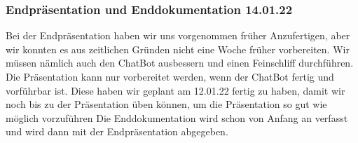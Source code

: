 \subsubsection{Endpräsentation und Enddokumentation 14.01.22}
Bei der Endpräsentation haben wir uns vorgenommen früher Anzufertigen, aber wir konnten es aus zeitlichen Gründen nicht eine Woche früher vorbereiten.
Wir müssen nämlich auch den ChatBot ausbessern und einen Feinschliff durchführen. Die Präsentation kann nur vorbereitet werden, wenn der ChatBot fertig und vorführbar ist. 
Diese haben wir geplant am 12.01.22 fertig zu haben, damit wir noch bis zu der Präsentation üben können,
um die Präsentation so gut wie möglich vorzuführen
Die Enddokumentation wird schon von Anfang an verfasst und wird dann mit der Endpräsentation abgegeben.